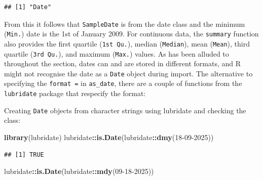 \documentclass[
]{book}
\newenvironment{Shaded}{\begin{snugshade}}{\end{snugshade}}
\newcommand{\FunctionTok}[1]{\textcolor[rgb]{0.13,0.29,0.53}{\textbf{#1}}}
\newcommand{\NormalTok}[1]{#1}
\newcommand{\SpecialCharTok}[1]{\textcolor[rgb]{0.81,0.36,0.00}{\textbf{#1}}}
\newcommand{\StringTok}[1]{\textcolor[rgb]{0.31,0.60,0.02}{#1}}
\begin{document}
\begin{Shaded}
\end{Shaded}

\begin{verbatim}
## [1] "Date"
\end{verbatim}

From this it follows that \texttt{SampleDate} is from the date class and the minimum (\texttt{Min.}) date is the 1st of January 2009. For continuous data, the \texttt{summary} function also provides the first quartile (\texttt{1st\ Qu.}), median (\texttt{Median}), mean (\texttt{Mean}), third quartile (\texttt{3rd\ Qu.}), and maximum (\texttt{Max.}) values. As has been alluded to throughout the section, dates can and are stored in different formats, and R might not recognise the date as a \texttt{Date} object during import. The alternative to specifying the \texttt{format\ =} in \texttt{as\_date}, there are a couple of functions from the \texttt{lubridate} package that respecify the format:

Creating \texttt{Date} objects from character strings using lubridate and checking the class:

\begin{Shaded}
\begin{Highlighting}[]
\FunctionTok{library}\NormalTok{(lubridate)}
\NormalTok{lubridate}\SpecialCharTok{::}\FunctionTok{is.Date}\NormalTok{(lubridate}\SpecialCharTok{::}\FunctionTok{dmy}\NormalTok{(}\StringTok{\textquotesingle{}18{-}09{-}2025\textquotesingle{}}\NormalTok{))}
\end{Highlighting}
\end{Shaded}

\begin{verbatim}
## [1] TRUE
\end{verbatim}

\begin{Shaded}
\begin{Highlighting}[]
\NormalTok{lubridate}\SpecialCharTok{::}\FunctionTok{is.Date}\NormalTok{(lubridate}\SpecialCharTok{::}\FunctionTok{mdy}\NormalTok{(}\StringTok{\textquotesingle{}09{-}18{-}2025\textquotesingle{}}\NormalTok{))}
\end{Highlighting}
\end{Shaded}
\end{document}
